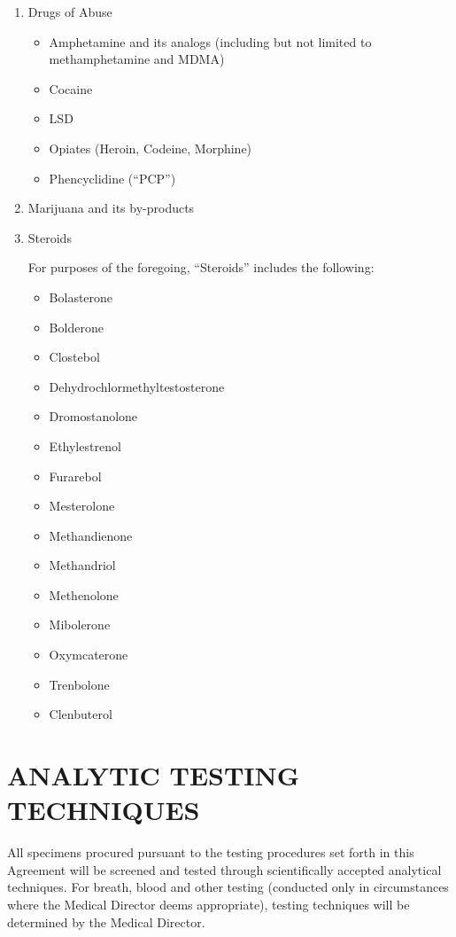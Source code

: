 \documentclass[
]{book}
\providecommand{\tightlist}{%
  \setlength{\itemsep}{0pt}\setlength{\parskip}{0pt}}
\begin{document}
\begin{enumerate}
\def\labelenumi{(\alph{enumi})}
\item
  Drugs of Abuse

  \begin{itemize}
  \tightlist
  \item
    Amphetamine and its analogs (including but not limited to methamphetamine and MDMA)
  \item
    Cocaine
  \item
    LSD
  \item
    Opiates (Heroin, Codeine, Morphine)
  \item
    Phencyclidine (``PCP'')
  \end{itemize}
\item
  Marijuana and its by-products
\item
  Steroids

  For purposes of the foregoing, ``Steroids'' includes the following:

  \begin{itemize}
  \tightlist
  \item
    Bolasterone
  \item
    Bolderone
  \item
    Clostebol
  \item
    Dehydrochlormethyltestosterone
  \item
    Dromostanolone
  \item
    Ethylestrenol
  \item
    Furarebol
  \item
    Mesterolone
  \item
    Methandienone
  \item
    Methandriol
  \item
    Methenolone
  \item
    Mibolerone
  \item
    Oxymcaterone
  \item
    Trenbolone
  \item
    Clenbuterol
  \end{itemize}
\end{enumerate}

\hypertarget{analytic-testing-techniques}{%
\section{ANALYTIC TESTING TECHNIQUES}\label{analytic-testing-techniques}}

All specimens procured pursuant to the testing procedures set forth in this Agreement will be screened and tested through scientifically accepted analytical techniques. For breath, blood and other testing (conducted only in circumstances where the Medical Director deems appropriate), testing techniques will be determined by the Medical Director.
\end{document}
